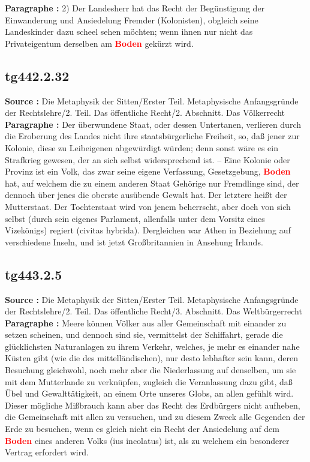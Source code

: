 \documentclass[a4paper,12pt,twoside]{book}
\newcommand{\match}[1]{\textcolor{red}{\textbf{#1}}}
\begin{document}
	\textbf{Paragraphe : }
	2) Der Landesherr hat das Recht der Begünstigung der Einwanderung und Ansiedelung Fremder (Kolonisten), obgleich seine Landeskinder dazu scheel sehen möchten; wenn ihnen nur nicht das Privateigentum derselben am \match{Boden} gekürzt wird. 
	
	\subsection*{tg442.2.32} 
	\textbf{Source : }Die Metaphysik der Sitten/Erster Teil. Metaphysische Anfangsgründe der Rechtslehre/2. Teil. Das öffentliche Recht/2. Abschnitt. Das Völkerrecht\\  
	
	\textbf{Paragraphe : }Der überwundene Staat, oder dessen Untertanen, verlieren durch die Eroberung des Landes nicht ihre staatsbürgerliche Freiheit, so, daß jener zur Kolonie, diese zu Leibeigenen abgewürdigt würden; denn sonst wäre es ein Strafkrieg gewesen, der an sich selbst widersprechend ist. – Eine Kolonie oder Provinz ist ein Volk, das zwar seine eigene Verfassung, Gesetzgebung, \match{Boden} hat, auf welchem die zu einem anderen Staat Gehörige nur Fremdlinge sind, der dennoch über jenes die oberste ausübende Gewalt hat. Der letztere heißt der Mutterstaat. Der Tochterstaat wird von jenem beherrscht, aber doch von sich selbst (durch sein eigenes Parlament, allenfalls unter dem Vorsitz eines Vizekönigs) regiert (civitas hybrida). Dergleichen war Athen in Beziehung auf verschiedene Inseln, und ist jetzt Großbritannien in Ansehung Irlands. 
	
	\subsection*{tg443.2.5} 
	\textbf{Source : }Die Metaphysik der Sitten/Erster Teil. Metaphysische Anfangsgründe der Rechtslehre/2. Teil. Das öffentliche Recht/3. Abschnitt. Das Weltbürgerrecht\\  
	
	\textbf{Paragraphe : }Meere können Völker aus aller Gemeinschaft mit einander zu setzen scheinen, und dennoch sind sie, vermittelst der Schiffahrt, gerade die glücklichsten Naturanlagen zu ihrem Verkehr, welches, je mehr es einander nahe Küsten gibt (wie die des mittelländischen), nur desto lebhafter sein kann, deren Besuchung gleichwohl, noch mehr aber die Niederlassung auf denselben, um sie mit dem Mutterlande zu verknüpfen, zugleich die Veranlassung dazu gibt, daß Übel und Gewalttätigkeit, an einem Orte unseres Globs, an allen gefühlt wird. Dieser mögliche Mißbrauch kann aber das Recht des Erdbürgers nicht aufheben, die Gemeinschaft mit allen zu versuchen, und zu diesem Zweck alle Gegenden der Erde zu besuchen, wenn es gleich nicht ein Recht der Ansiedelung auf dem \match{Boden} eines anderen Volks (ius incolatus) ist, als zu welchem ein besonderer Vertrag erfordert wird. 
	
\end{document}
